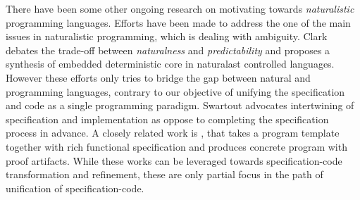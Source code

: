 \documentclass[11pt]{article}
\begin{document}
There have been some other ongoing research \cite{Knoll:2006, Maragoudakis:2008, Ballard:1979, Bruckman:1999, Chong:2004} on motivating towards \emph{naturalistic} programming languages. Efforts \cite{Arnold:2010, Begel:2006} have been made to address the one of the main issues in naturalistic programming, which is dealing with ambiguity. Clark \etal debates the trade-off between \emph{naturalness} and \emph{predictability} and proposes a synthesis of embedded deterministic core in naturalast controlled languages. However these efforts only tries to bridge the gap between natural and programming languages, contrary to our objective of unifying the specification and code as a single programming paradigm. Swartout \etal advocates intertwining of specification and implementation as oppose to completing the specification process in advance. A closely related work is \cite{Qiu:2017}, that takes a program template together with rich functional specification and produces concrete program with proof artifacts. While these works can be leveraged towards specification-code transformation and refinement, these are only partial focus in the path of unification of specification-code.
\end{document}
